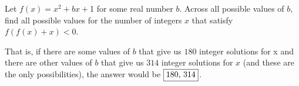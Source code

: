 
Let $f(x)=x^{2}+bx+$1 for some real number $b$. Across all possible values of $b$, find all possible values for the number of integers $x$ that satisfy $f(f(x)+x)<0$.

That is, if there are some values of $b$ that give us $180$ integer solutions for x and there are other values of $b$ that give us $314$ integer solutions for $x$ (and these are the only possibilities), the answer would be $\fbox{180,~314}$.
